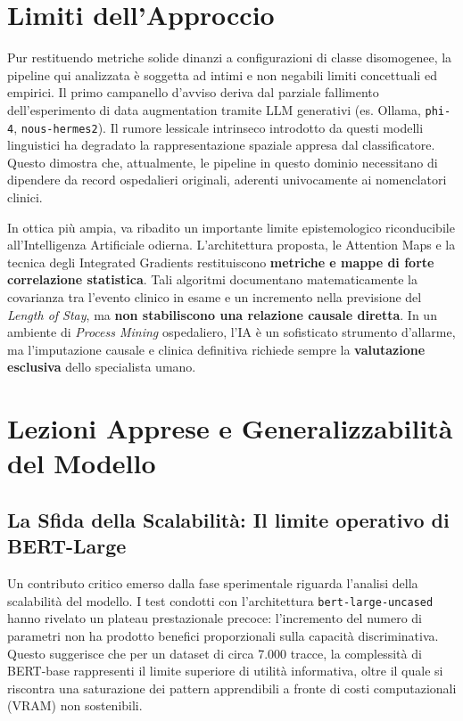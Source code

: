 \section{Limiti dell'Approccio}
Pur restituendo metriche solide dinanzi a configurazioni di classe disomogenee, la pipeline qui analizzata è soggetta ad intimi e non negabili limiti concettuali ed empirici.
Il primo campanello d'avviso deriva dal parziale fallimento dell'esperimento di data augmentation tramite LLM generativi (es. Ollama, \texttt{phi-4}, \texttt{nous-hermes2}). Il rumore lessicale intrinseco introdotto da questi modelli linguistici ha degradato la rappresentazione spaziale appresa dal classificatore. Questo dimostra che, attualmente, le pipeline in questo dominio necessitano di dipendere da record ospedalieri originali, aderenti univocamente ai nomenclatori clinici.

In ottica più ampia, va ribadito un importante limite epistemologico riconducibile all'Intelligenza Artificiale odierna. L'architettura proposta, le Attention Maps e la tecnica degli Integrated Gradients restituiscono \textbf{metriche e mappe di forte correlazione statistica}. Tali algoritmi documentano matematicamente la covarianza tra l'evento clinico in esame e un incremento nella previsione del \textit{Length of Stay}, ma \textbf{non stabiliscono una relazione causale diretta}. In un ambiente di \textit{Process Mining} ospedaliero, l'IA è un sofisticato strumento d'allarme, ma l'imputazione causale e clinica definitiva richiede sempre la \textbf{valutazione esclusiva} dello specialista umano.

\section{Lezioni Apprese e Generalizzabilità del Modello}

\subsection{La Sfida della Scalabilità: Il limite operativo di BERT-Large}
Un contributo critico emerso dalla fase sperimentale riguarda l'analisi della scalabilità del modello. I test condotti con l'architettura \texttt{bert-large-uncased} hanno rivelato un plateau prestazionale precoce: l'incremento del numero di parametri non ha prodotto benefici proporzionali sulla capacità discriminativa. Questo suggerisce che per un dataset di circa 7.000 tracce, la complessità di BERT-base rappresenti il limite superiore di utilità informativa, oltre il quale si riscontra una saturazione dei pattern apprendibili a fronte di costi computazionali (VRAM) non sostenibili.

